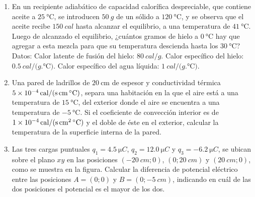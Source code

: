 \documentclass[a4paper,11pt,dvipsnames, twocolumn]{article}
\begin{document}
\begin{enumerate}[wide, labelwidth=2pt, labelindent=0pt]
\begin{center}
\end{center}

\item En un recipiente adiabático de capacidad calorífica despreciable, que contiene aceite a $\SI{25}{\celsius}$, se introducen $\SI{50}{g}$ de un sólido a $\SI{120}{\celsius}$, y se observa que el aceite recibe $\SI{150}{cal}$ hasta alcanzar el equilibrio, a una temperatura de $\SI{41}{\celsius}$. Luego de alcanzado el equilibrio, ¿cuántos gramos de hielo a $\SI{0}{\celsius}$ hay que agregar a esta mezcla para que su temperatura descienda hasta los $\SI{30}{\celsius}$? Datos: Calor latente de fusión del hielo: $\SI{80}{cal/g}$. Calor específico del hielo: $\SI{0.5}{cal/(g . \celsius)}$. Calor específico del agua líquida: $\SI{1}{cal/(g . \celsius)}$.

\item Una pared de ladrillos de $\SI{20}{\centi\metre}$ de espesor y conductividad térmica $\SI{5E-4}{cal/(\second.\centi\metre.\celsius)}$, separa una habitación en la que el aire está a una temperatura de $\SI{15}{\celsius}$, del exterior donde el aire se encuentra a una temperatura de $\SI{-5}{\celsius}$. Si el coeficiente de convección interior es de $\SI{1E-4}{cal/(\second.\centi\square\metre.\celsius)}$ y el doble de  éste en el exterior, calcular la temperatura de la superficie interna de la pared.

\item Las tres cargas puntuales $q_1 = \SI{4.5}{\micro C}$, $q_2 = \SI{12.0}{\micro C}$ y $q_3 = \SI{-6.2}{\micro C}$, se ubican sobre el plano $xy$ en las posiciones $(\SI{-20}{cm}; 0)$, $(0; \SI{20}{cm})$ y $(\SI{20}{cm}; 0)$, como se muestra en la figura. Calcular la diferencia de potencial eléctrico entre las posiciones $A = (0;0)$ y $B = (0; \SI{-5}{cm})$, indicando en cuál de las dos posiciones el potencial es el mayor de los dos.
\begin{center}
\end{center}



\end{enumerate}
\end{document}
